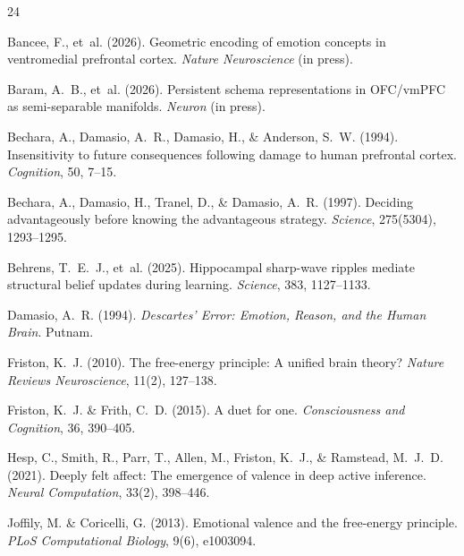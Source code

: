 \documentclass[11pt,a4paper]{article}
\begin{document}
\begin{thebibliography}{24}

Bancee, F., et~al. (2026).
\newblock Geometric encoding of emotion concepts in ventromedial prefrontal cortex.
\newblock \emph{Nature Neuroscience} (in press).

Baram, A.~B., et~al. (2026).
\newblock Persistent schema representations in {OFC/vmPFC} as semi-separable manifolds.
\newblock \emph{Neuron} (in press).

Bechara, A., Damasio, A.~R., Damasio, H., \& Anderson, S.~W. (1994).
\newblock Insensitivity to future consequences following damage to human prefrontal cortex.
\newblock \emph{Cognition}, 50, 7--15.

Bechara, A., Damasio, H., Tranel, D., \& Damasio, A.~R. (1997).
\newblock Deciding advantageously before knowing the advantageous strategy.
\newblock \emph{Science}, 275(5304), 1293--1295.

Behrens, T.~E.~J., et~al. (2025).
\newblock Hippocampal sharp-wave ripples mediate structural belief updates during learning.
\newblock \emph{Science}, 383, 1127--1133.

Damasio, A.~R. (1994).
\newblock \emph{Descartes' Error: Emotion, Reason, and the Human Brain}.
\newblock Putnam.

Friston, K.~J. (2010).
\newblock The free-energy principle: A unified brain theory?
\newblock \emph{Nature Reviews Neuroscience}, 11(2), 127--138.

Friston, K.~J. \& Frith, C.~D. (2015).
\newblock A duet for one.
\newblock \emph{Consciousness and Cognition}, 36, 390--405.

Hesp, C., Smith, R., Parr, T., Allen, M., Friston, K.~J., \& Ramstead, M.~J.~D. (2021).
\newblock Deeply felt affect: The emergence of valence in deep active inference.
\newblock \emph{Neural Computation}, 33(2), 398--446.

Joffily, M. \& Coricelli, G. (2013).
\newblock Emotional valence and the free-energy principle.
\newblock \emph{PLoS Computational Biology}, 9(6), e1003094.


\end{thebibliography}
\end{document}
